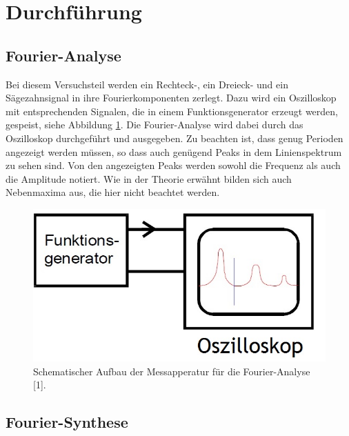 \section{Durchführung}
\label{sec:Durchführung}

\subsection{Fourier-Analyse}

Bei diesem Versuchsteil werden ein Rechteck-, ein Dreieck- und 
ein Sägezahnsignal in ihre Fourierkomponenten zerlegt. Dazu wird
ein Oszilloskop mit entsprechenden Signalen, die in einem Funktionsgenerator 
erzeugt werden, gespeist, siehe Abbildung \ref{fig:aufbau}. 
Die Fourier-Analyse wird dabei durch das
Oszilloskop durchgeführt und ausgegeben. Zu beachten ist, dass genug
Perioden angezeigt werden müssen, so dass auch genügend Peaks in dem 
Linienspektrum zu sehen sind. Von den angezeigten Peaks werden sowohl
die Frequenz als auch die Amplitude notiert. Wie in der Theorie erwähnt
bilden sich auch Nebenmaxima aus, die hier nicht beachtet werden. 

\begin{figure}
  \centering
  \includegraphics[scale=0.5]{content/Aufbau_1.jpg}
  \caption{Schematischer Aufbau der Messapperatur für die Fourier-Analyse [1].}
  \label{fig:aufbau}
\end{figure}

\subsection{Fourier-Synthese}

